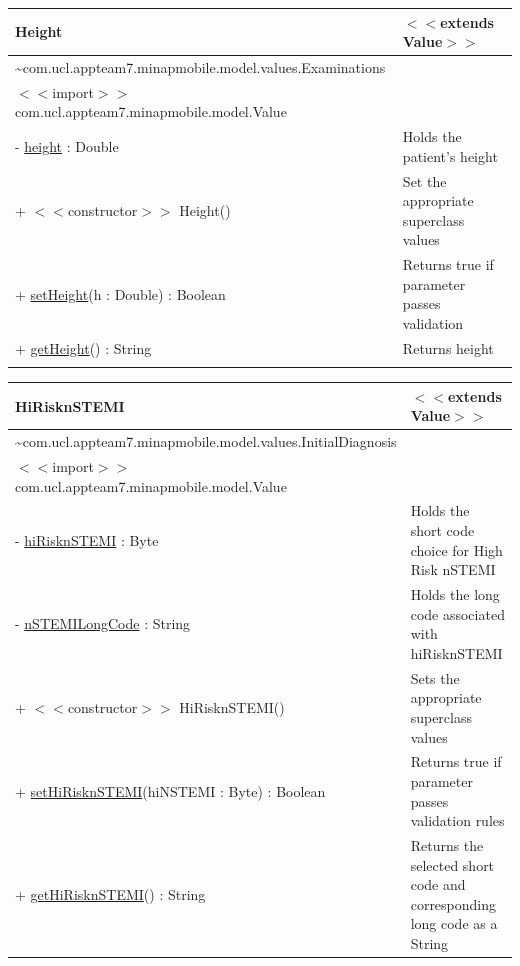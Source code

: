 \documentclass[12pt,a4paper,oneside,titlepage]{article}
\begin{document}
\begin{center}
	\begin{tabular}{| p{13cm} | p{5cm} |}
	\hline
	\textbf{Height} & \textbf{$<<$extends Value$>>$} \\ \hline
	\textasciitilde com.ucl.appteam7.minapmobile.model.values.Examinations & \\ \hline
	$<<$import$>>$ com.ucl.appteam7.minapmobile.model.Value & \\ \hline \hline
	- \underline{height} : Double & Holds the patient's height \\ \hline \hline
	+ $<<$constructor$>>$ Height() & Set the appropriate superclass values \\ \hline
	+ \underline{setHeight}(h : Double) : Boolean & Returns true if parameter passes validation \\ \hline
	+ \underline{getHeight}() : String & Returns height \\&\\ \hline
	\end{tabular}
\end{center}

\begin{center}
	\begin{tabular}{| p{13cm} | p{5cm} |}
	\hline
	\textbf{HiRisknSTEMI} & \textbf{$<<$extends Value$>>$} \\ \hline
	\textasciitilde com.ucl.appteam7.minapmobile.model.values.InitialDiagnosis & \\ \hline
	$<<$import$>>$ com.ucl.appteam7.minapmobile.model.Value & \\ \hline \hline
	- \underline{hiRisknSTEMI} : Byte & Holds the short code choice for High Risk nSTEMI \\ \hline
	- \underline{nSTEMILongCode} : String & Holds the long code associated with hiRisknSTEMI \\ \hline \hline
	+ $<<$constructor$>>$ HiRisknSTEMI() & Sets the appropriate superclass values \\ \hline
	+ \underline{setHiRisknSTEMI}(hiNSTEMI : Byte) : Boolean & Returns true if parameter passes validation rules \\ \hline
	+ \underline{getHiRisknSTEMI}() : String & Returns the selected short code and corresponding long code as a String \\ \hline
	\end{tabular}
\end{center}
\end{document}
